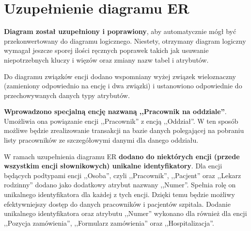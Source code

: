 \section{Uzupełnienie diagramu ER}
\textbf{Diagram został uzupełniony i poprawiony}, aby automatycznie mógł być przekonwertowany do diagramu logicznego. Niestety, otrzymany diagram logiczny wymagał jeszcze sporej ilości ręcznych poprawek takich jak usuwanie niepotrzebnych kluczy i więzów oraz zmiany nazw tabel i atrybutów.

Do diagramu związków encji dodano wspomniany wyżej związek wieloznaczny (zamieniony odpowiednio na encję i dwa związki) i ustanowiono odpowiednie do przechowywanych danych typy atrybutów.

\textbf{Wprowadzono specjalną encję nazwaną ,,Pracownik na oddziale''}. Umożliwia ona powiązanie encji ,,Pracownik'' z encją ,,Oddział''. W ten sposób możliwe będzie zrealizowanie transakcji na bazie danych polegającej na pobraniu listy pracowników ze szczegółowymi danymi dla danego oddziału.

W ramach uzupełnienia diagramu ER \textbf{dodano do niektórych encji (przede wszystkim encji słownikowych) unikalne identyfikatory}.
Dla encji będących podtypami encji ,,Osoba'', czyli ,,Pracownik'', ,,Pacjent'' oraz ,,Lekarz rodzinny'' dodano jako dodatkowy atrybut nazwany ,,Numer''. Spełnia rolę on unikalnego identyfikatora dla każdej z tych encji. Dzięki temu będzie możliwy efektywniejszy dostęp do danych pracowników i pacjentów szpitala. Dodanie unikalnego identyfikatora oraz atrybutu ,,Numer'' wykonano dla  również dla encji ,,Pozycja zamówienia'', ,,Formularz zamówienia'' oraz ,,Hospitalizacja''.



